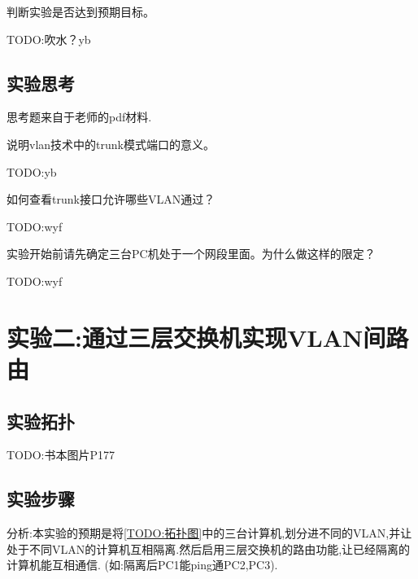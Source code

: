 \documentclass{myreport}
\begin{document}
\begin{tcolorbox}[title = {观察五}]
判断实验是否达到预期目标。
\end{tcolorbox}

TODO:吹水？yb

\section{实验思考}

思考题来自于老师的pdf材料.

\begin{tcolorbox}[title = {思考题一}]
说明vlan技术中的trunk模式端口的意义。
\end{tcolorbox}

TODO:yb

\begin{tcolorbox}[title = {思考题二}]
如何查看trunk接口允许哪些VLAN通过？
\end{tcolorbox}
TODO:wyf

\begin{tcolorbox}[title = {思考题三}]
实验开始前请先确定三台PC机处于一个网段里面。为什么做这样的限定？
\end{tcolorbox}
TODO:wyf


\chapter{实验二:通过三层交换机实现VLAN间路由}

\section{实验拓扑}

TODO:书本图片P177

\section{实验步骤}

分析:本实验的预期是将\autoref{TODO:拓扑图}中的三台计算机,划分进不同的VLAN,并让处于不同VLAN的计算机互相隔离.然后启用三层交换机的路由功能,让已经隔离的计算机能互相通信.
(如:隔离后PC1能ping通PC2,PC3).
\end{document}
